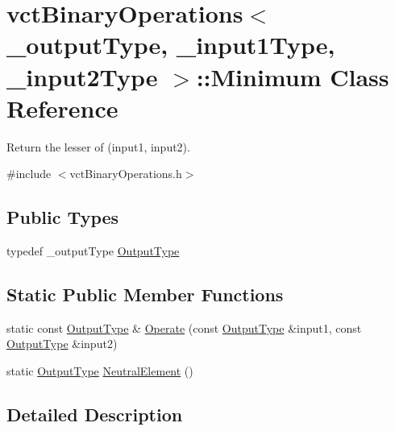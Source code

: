 \hypertarget{classvct_binary_operations_1_1_minimum}{}\section{vct\+Binary\+Operations$<$ \+\_\+output\+Type, \+\_\+input1\+Type, \+\_\+input2\+Type $>$\+:\+:Minimum Class Reference}
\label{classvct_binary_operations_1_1_minimum}


Return the lesser of (input1, input2).  




{\ttfamily \#include $<$vct\+Binary\+Operations.\+h$>$}

\subsection*{Public Types}
\begin{DoxyCompactItemize}
\item 
typedef \+\_\+output\+Type \hyperlink{classvct_binary_operations_1_1_minimum_a3a43e1925b5600853520784d42b58299}{Output\+Type}
\end{DoxyCompactItemize}
\subsection*{Static Public Member Functions}
\begin{DoxyCompactItemize}
\item 
static const \hyperlink{classvct_binary_operations_1_1_minimum_a3a43e1925b5600853520784d42b58299}{Output\+Type} \& \hyperlink{classvct_binary_operations_1_1_minimum_a64198cb11c3be01a49d1114ff9ffd6c8}{Operate} (const \hyperlink{classvct_binary_operations_1_1_minimum_a3a43e1925b5600853520784d42b58299}{Output\+Type} \&input1, const \hyperlink{classvct_binary_operations_1_1_minimum_a3a43e1925b5600853520784d42b58299}{Output\+Type} \&input2)
\item 
static \hyperlink{classvct_binary_operations_1_1_minimum_a3a43e1925b5600853520784d42b58299}{Output\+Type} \hyperlink{classvct_binary_operations_1_1_minimum_a5b1f11cba02d44ef5b613f321e265c85}{Neutral\+Element} ()
\end{DoxyCompactItemize}


\subsection{Detailed Description}
